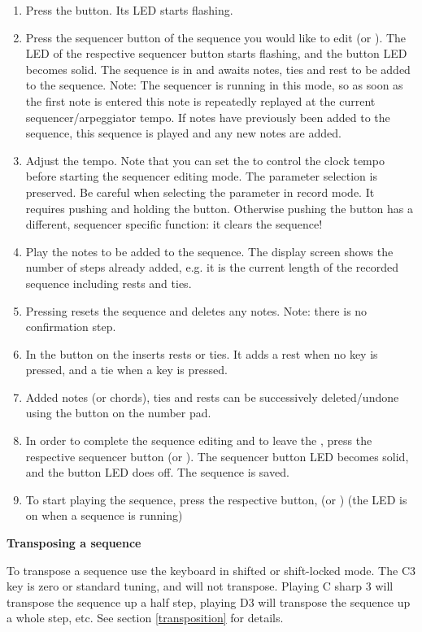 \begin{enumerate}
  \item Press the \record button. Its LED starts flashing.
  \item Press the sequencer button of the sequence you would like to edit (\seqone or \seqtwo). The LED of the respective sequencer button starts flashing, and the \record button LED becomes solid. The sequence is in \seqedit and awaits notes, ties and rest to be added to the sequence. Note: The sequencer is running in this mode, so as soon as the first note is entered this note is repeatedly replayed at the current sequencer/arpeggiator tempo. If notes have previously been added to the sequence, this sequence is played and any new notes are added. 
  \item Adjust the tempo. Note that you can set the \datadial to control the clock tempo before starting the sequencer editing mode. The parameter selection is preserved. Be careful when selecting the parameter in record mode. It requires pushing and holding  the \totape button. Otherwise pushing the  button has a different, sequencer specific function: it clears the sequence!  
  \item Play the notes to be added to the sequence. The display screen shows the number of steps already added, e.g. it is the current length of the recorded sequence including rests and ties.
  \item Pressing  resets the sequence and deletes any notes. Note: there is no confirmation step. 
  \item In \seqedit the  button on the \termnumberpad inserts rests or ties. It adds a rest when no key is pressed, and a tie when a key is pressed.
  \item Added notes (or chords), ties and rests can be successively deleted/undone using the  button on the number pad. 
  \item In order to complete the sequence editing and to leave the \seqedit, press the respective sequencer button (\seqone or \seqtwo). The sequencer button LED becomes solid, and the \record button LED does off. The sequence is saved. 
  \item To start playing the sequence, press the respective button, (\seqone or \seqtwo) (the LED is on when a sequence is running)
\end{enumerate}

\textbf{Transposing a  sequence}

To transpose a sequence use the keyboard in shifted or shift-locked mode. The C3 key is zero or standard tuning, and will not transpose. Playing C sharp 3 will transpose the sequence up a half step, playing D3 will transpose the sequence up a whole step, etc. See section \ref{transposition} for details.

